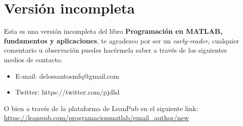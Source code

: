 \chapter*{Versión incompleta}

Esta es una versión incompleta del libro \textbf{Programación en MATLAB,
fundamentos y aplicaciones}, te agradezco por ser un
\emph{early-reader}, cualquier comentario u observación puedes hacérmela
saber a través de los siguientes medios de contacto.

\begin{itemize}
\item E-mail: delossantosmfq@gmail.com
\item Twitter: https://twitter.com/pjdlsl
\end{itemize}

O bien a través de la plataforma de LeanPub en el siguiente link: 
\url{https://leanpub.com/programacionmatlab/email_author/new}